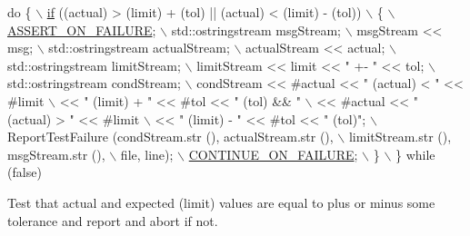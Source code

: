 \begin{DoxyCode}
\textcolor{keywordflow}{do} \{                                                                  \hyperlink{loss__ITU1238_8m_a419d895abe1313c35fa353c93802647e}{\(\backslash\)}
\hyperlink{loss__ITU1238_8m_a419d895abe1313c35fa353c93802647e}{    if} ((actual) > (limit) + (tol) || (actual) < (limit) - (tol))       \(\backslash\)
      \{                                                                 \hyperlink{group__testing_ga044d7c8c214fe3761af96ee3cbe2edc3}{\(\backslash\)}
\hyperlink{group__testing_ga044d7c8c214fe3761af96ee3cbe2edc3}{        ASSERT\_ON\_FAILURE};                                              \(\backslash\)
        std::ostringstream msgStream;                                   \(\backslash\)
        msgStream << msg;                                               \(\backslash\)
        std::ostringstream actualStream;                                \(\backslash\)
        actualStream << actual;                                         \(\backslash\)
        std::ostringstream limitStream;                                 \(\backslash\)
        limitStream << limit << \textcolor{stringliteral}{" +- "} << tol;                          \(\backslash\)
        std::ostringstream condStream;                                  \(\backslash\)
        condStream << #actual << \textcolor{stringliteral}{" (actual) < "} << #limit               \(\backslash\)
                   << \textcolor{stringliteral}{" (limit) + "} << #tol << \textcolor{stringliteral}{" (tol) && "}             \(\backslash\)
                   << #actual << \textcolor{stringliteral}{" (actual) > "} << #limit               \(\backslash\)
                   << \textcolor{stringliteral}{" (limit) - "} << #tol << \textcolor{stringliteral}{" (tol)"};                \(\backslash\)
        ReportTestFailure (condStream.str (), actualStream.str (),      \(\backslash\)
                       limitStream.str (), msgStream.str (),            \(\backslash\)
                       file, line);                                     \hyperlink{group__testing_ga6f2bed856695445564c93cd367c69ea0}{\(\backslash\)}
\hyperlink{group__testing_ga6f2bed856695445564c93cd367c69ea0}{        CONTINUE\_ON\_FAILURE};                                            \(\backslash\)
      \}                                                                 \(\backslash\)
  \} \textcolor{keywordflow}{while} (\textcolor{keyword}{false})
\end{DoxyCode}


Test that actual and expected (limit) values are equal to plus or minus some tolerance and report and abort if not. 

